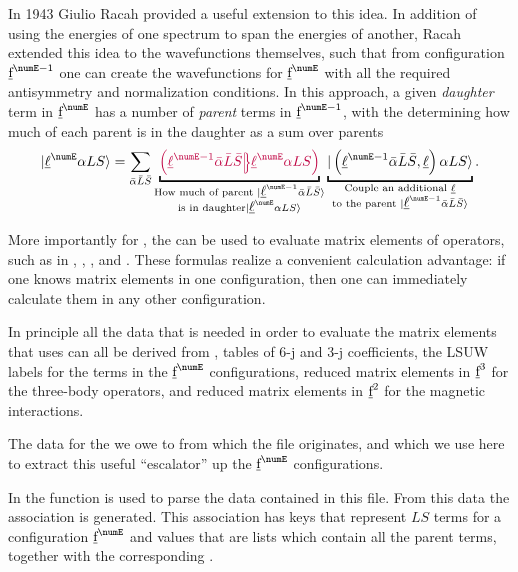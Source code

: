 \documentclass[11pt, twoside,openright]{article}
\begin{document}
In 1943 Giulio Racah \cite{racah_theory_1943} provided a useful extension to this idea. In addition of using the energies of one spectrum to span the energies of another, Racah extended this idea to the wavefunctions themselves, such that from configuration $\forb^{\numE-1}$ one can create the wavefunctions for $\forb^{\numE}$ with all the required antisymmetry and normalization conditions. In this approach, a given \textit{daughter} term in $\forb^{\numE}$ has a number of \textit{parent} terms in $\forb^{\numE-1}$, with the \cfps determining how much of each parent is in the daughter as a sum over parents
\begin{equation}
\ket{\lorb^\numE \alpha LS} = 
	\sum_{\bar{\alpha}\bar{L}
		\bar{S}} 
		\underbracket{\cfp{\lorb^{\numE-1}\bar{\alpha}\bar{L}\bar{S}}
			{\lorb^{\numE}\alpha{LS}}}_
		{\substack{
            \text{How much of parent }\ket{\lorb^{\numE-1}\bar{\alpha}\bar{L}\bar{S}} \\
            \text{is in daughter}\ket{\lorb^{\numE}{\alpha}{L}{S}}
            }
        }
		\underbracket{\ket{\left(\lorb^{\numE-1}\bar{\alpha}\bar{L}\bar{S},\lorb\right)\alpha{LS}}}_
		{\substack{
            \text{Couple an additional $\lorb$} \\
            \text{to the parent }\ket{\lorb^{\numE-1}\bar{\alpha}\bar{L}\bar{S}}
            }
        }.
\end{equation}

More importantly for \qlanth, the \cfps can be used to evaluate matrix elements of operators, such as in , , , and . These formulas realize a convenient calculation advantage: if one knows matrix elements in one configuration, then one can immediately calculate them in any other configuration.

In principle all the data that is needed in order to evaluate the matrix elements that \qlanth uses can all be derived from \cfps, tables of 6-j and 3-j coefficients, the LSUW labels for the terms in the $\forb^{\numE}$ configurations, reduced matrix elements in $\underbar{\text{f}}^3$ for the three-body operators, and reduced matrix elements in $\underbar{\text{f}}^2$ for the magnetic interactions. 

The data for the \cfps we owe to \cite{velkov_multi-electron_2000} from which the file  originates, and which we use here to extract this useful ``escalator'' up the $\forb^{\numE}$ configurations.

In \qlanth the function  is used to parse the data contained in this file. From this data the association  is generated. This association has keys that represent $LS$ terms for a configuration $\forb^{\numE}$ and values that are lists which contain all the parent terms, together with the corresponding \cfps.
\end{document}
